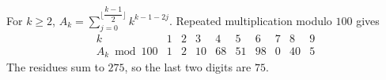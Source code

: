 For $k\ge2$, $A_k=\sum_{j=0}^{\lfloor\dfrac{k-1}{2}\rfloor}k^{k-1-2j}$. Repeated multiplication modulo $100$ gives
\[\begin{array}{c|rrrrrrrrr}k&1&2&3&4&5&6&7&8&9\\\hline A_k\bmod100&1&2&10&68&51&98&0&40&5\end{array}\]
The residues sum to $275$, so the last two digits are $\boxed{75}$.
